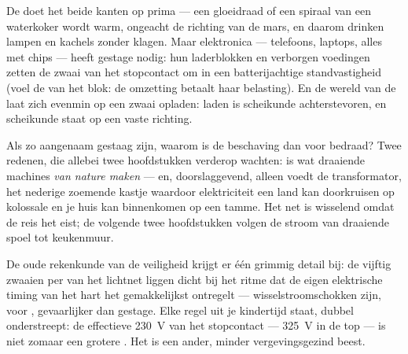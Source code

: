 \begin{example}\label{ex:g9:alternating-current:whocares}
De  doet het beide kanten op prima --- een
gloeidraad of een spiraal van een waterkoker wordt warm, ongeacht de
richting van de mars, en daarom drinken lampen en kachels 
zonder klagen. Maar elektronica --- telefoons, laptops, alles met chips
--- heeft gestage  nodig: hun laderblokken en verborgen
voedingen zetten de zwaai van het stopcontact om in een
batterijachtige standvastigheid (voel de  van het blok: de
omzetting betaalt haar belasting). En de wereld van de
 laat zich evenmin op een zwaai opladen: laden is
scheikunde achterstevoren, en scheikunde staat op een vaste richting.
\end{example}

\begin{remark}\label{rem:g9:alternating-current:why}
Als  zo aangenaam gestaag zijn, waarom is de beschaving dan
voor  bedraad? Twee redenen, die allebei twee hoofdstukken
verderop wachten:  is wat draaiende machines
\emph{van nature maken} --- en, doorslaggevend, alleen 
voedt de transformator, het nederige zoemende kastje waardoor
elektriciteit een land kan doorkruisen op kolossale
 en je huis kan binnenkomen op een tamme. Het net is
wisselend omdat de reis het eist; de volgende twee hoofdstukken volgen
de stroom van draaiende spoel tot keukenmuur.
\end{remark}

\begin{remark}\label{rem:g9:alternating-current:safety}
De oude rekenkunde van de veiligheid krijgt er één grimmig detail bij:
de vijftig zwaaien per  van het lichtnet liggen dicht bij het
ritme dat de eigen elektrische timing van het hart het gemakkelijkst
ontregelt --- wisselstroomschokken zijn,  voor
, gevaarlijker dan gestage. Elke regel uit je
kindertijd staat, dubbel onderstreept: de effectieve \qty{230}{V} van
het stopcontact --- \qty{325}{V} in de top --- is niet zomaar een
grotere . Het is een ander, minder vergevingsgezind
beest.
\end{remark}

